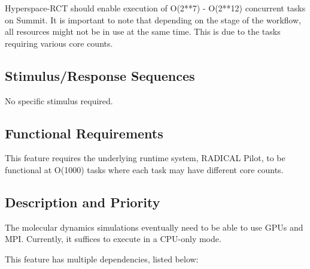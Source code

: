 \documentclass{scrreprt}
\begin{document}
Hyperspace-RCT should enable execution of O(2**7) - O(2**12) concurrent tasks on Summit. It is important to note that depending on the stage of the workflow, all resources might not be in use at the same time. This is due to the tasks requiring various core counts.


\subsection{Stimulus/Response Sequences}

No specific stimulus required.

\subsection{Functional Requirements}


This feature requires the underlying runtime system, RADICAL Pilot, to be functional at O(1000) tasks where each task may have different core counts.

\subsection{Description and Priority}

The molecular dynamics simulations eventually need to be able to use GPUs and MPI. Currently, it suffices to execute in a CPU-only mode.

This feature has multiple dependencies, listed below:
\end{document}
